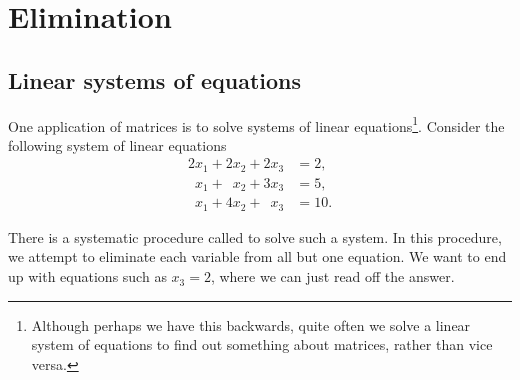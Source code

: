
\section{Elimination}
\label{elim:section}



\subsection{Linear systems of equations}

One application of matrices is to solve systems of
linear equations\footnote{Although perhaps we have this backwards,
quite often we solve a linear system of equations
to find out something about matrices, rather than vice versa.}.
Consider the following system of linear equations
\begin{equation} \label{linalg:elim:eq}
\begin{aligned}
          2 x_1 +           2 x_2 +           2 x_3 & = 2 , \\
\phantom{9} x_1 + \phantom{9} x_2 +           3 x_3 & = 5 , \\
\phantom{9} x_1 +           4 x_2 + \phantom{9} x_3 & = 10 .
\end{aligned}
\end{equation}

There is a systematic procedure
called \emph{} to solve such a system.
In this procedure,
we attempt to eliminate each variable from all but one equation.
We want to end up with equations
such as $x_3 = 2$, where we can just read off the answer.

